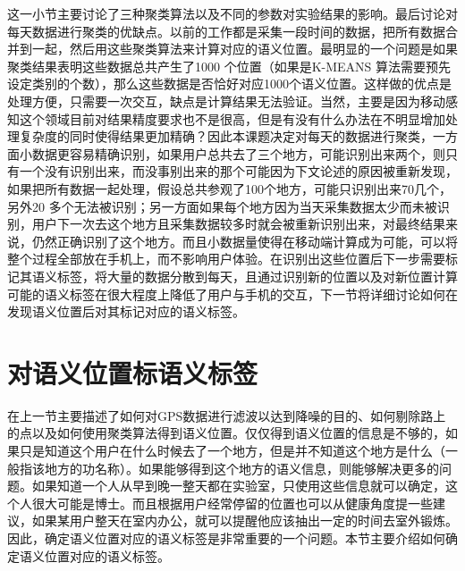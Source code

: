 \par 这一小节主要讨论了三种聚类算法以及不同的参数对实验结果的影响。最后讨论对每天数据进行聚类的优缺点。以前的工作都是采集一段时间的数据，把所有数据合并到一起，然后用这些聚类算法来计算对应的语义位置。最明显的一个问题是如果聚类结果表明这些数据总共产生了1000 个位置（如果是K-MEANS 算法需要预先设定类别的个数），那么这些数据是否恰好对应1000个语义位置。这样做的优点是处理方便，只需要一次交互，缺点是计算结果无法验证。当然，主要是因为移动感知这个领域目前对结果精度要求也不是很高，但是有没有什么办法在不明显增加处理复杂度的同时使得结果更加精确？因此本课题决定对每天的数据进行聚类，一方面小数据更容易精确识别，如果用户总共去了三个地方，可能识别出来两个，则只有一个没有识别出来，而没事别出来的那个可能因为下文论述的原因被重新发现，如果把所有数据一起处理，假设总共参观了100个地方，可能只识别出来70几个，另外20 多个无法被识别；另一方面如果每个地方因为当天采集数据太少而未被识别，用户下一次去这个地方且采集数据较多时就会被重新识别出来，对最终结果来说，仍然正确识别了这个地方。而且小数据量使得在移动端计算成为可能，可以将整个过程全部放在手机上，而不影响用户体验。在识别出这些位置后下一步需要标记其语义标签，将大量的数据分散到每天，且通过识别新的位置以及对新位置计算可能的语义标签在很大程度上降低了用户与手机的交互，下一节将详细讨论如何在发现语义位置后对其标记对应的语义标签。
\section{对语义位置标语义标签}
\label{sec:section3-3}
在上一节主要描述了如何对GPS数据进行滤波以达到降噪的目的、如何剔除路上的点以及如何使用聚类算法得到语义位置。仅仅得到语义位置的信息是不够的，如果只是知道这个用户在什么时候去了一个地方，但是并不知道这个地方是什么（一般指该地方的功名称）。如果能够得到这个地方的语义信息，则能够解决更多的问题。如果知道一个人从早到晚一整天都在实验室，只使用这些信息就可以确定，这个人很大可能是博士。而且根据用户经常停留的位置也可以从健康角度提一些建议，如果某用户整天在室内办公，就可以提醒他应该抽出一定的时间去室外锻炼。因此，确定语义位置对应的语义标签是非常重要的一个问题。本节主要介绍如何确定语义位置对应的语义标签。
